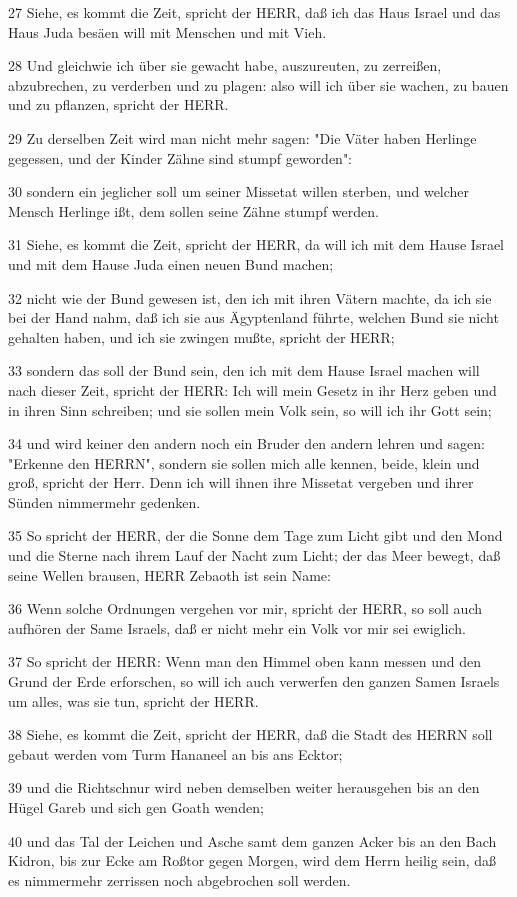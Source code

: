 \par 27 Siehe, es kommt die Zeit, spricht der HERR, daß ich das Haus Israel und das Haus Juda besäen will mit Menschen und mit Vieh.
\par 28 Und gleichwie ich über sie gewacht habe, auszureuten, zu zerreißen, abzubrechen, zu verderben und zu plagen: also will ich über sie wachen, zu bauen und zu pflanzen, spricht der HERR.
\par 29 Zu derselben Zeit wird man nicht mehr sagen: "Die Väter haben Herlinge gegessen, und der Kinder Zähne sind stumpf geworden":
\par 30 sondern ein jeglicher soll um seiner Missetat willen sterben, und welcher Mensch Herlinge ißt, dem sollen seine Zähne stumpf werden.
\par 31 Siehe, es kommt die Zeit, spricht der HERR, da will ich mit dem Hause Israel und mit dem Hause Juda einen neuen Bund machen;
\par 32 nicht wie der Bund gewesen ist, den ich mit ihren Vätern machte, da ich sie bei der Hand nahm, daß ich sie aus Ägyptenland führte, welchen Bund sie nicht gehalten haben, und ich sie zwingen mußte, spricht der HERR;
\par 33 sondern das soll der Bund sein, den ich mit dem Hause Israel machen will nach dieser Zeit, spricht der HERR: Ich will mein Gesetz in ihr Herz geben und in ihren Sinn schreiben; und sie sollen mein Volk sein, so will ich ihr Gott sein;
\par 34 und wird keiner den andern noch ein Bruder den andern lehren und sagen: "Erkenne den HERRN", sondern sie sollen mich alle kennen, beide, klein und groß, spricht der Herr. Denn ich will ihnen ihre Missetat vergeben und ihrer Sünden nimmermehr gedenken.
\par 35 So spricht der HERR, der die Sonne dem Tage zum Licht gibt und den Mond und die Sterne nach ihrem Lauf der Nacht zum Licht; der das Meer bewegt, daß seine Wellen brausen, HERR Zebaoth ist sein Name:
\par 36 Wenn solche Ordnungen vergehen vor mir, spricht der HERR, so soll auch aufhören der Same Israels, daß er nicht mehr ein Volk vor mir sei ewiglich.
\par 37 So spricht der HERR: Wenn man den Himmel oben kann messen und den Grund der Erde erforschen, so will ich auch verwerfen den ganzen Samen Israels um alles, was sie tun, spricht der HERR.
\par 38 Siehe, es kommt die Zeit, spricht der HERR, daß die Stadt des HERRN soll gebaut werden vom Turm Hananeel an bis ans Ecktor;
\par 39 und die Richtschnur wird neben demselben weiter herausgehen bis an den Hügel Gareb und sich gen Goath wenden;
\par 40 und das Tal der Leichen und Asche samt dem ganzen Acker bis an den Bach Kidron, bis zur Ecke am Roßtor gegen Morgen, wird dem Herrn heilig sein, daß es nimmermehr zerrissen noch abgebrochen soll werden.

